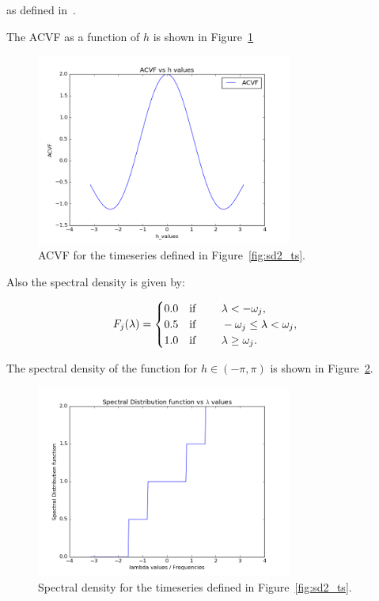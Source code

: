 \documentclass{article}
\begin{document}
as defined in~\cite{itsf}. 

The ACVF as a function of $h$ is shown in Figure~\ref{fig:sd2_acvf}

\begin{figure}[ht!]
  \centering
  \includegraphics[width=0.75\textwidth]{images/spectral_density_2/acvf}
  \caption{ACVF for the timeseries defined in Figure~\ref{fig:sd2_ts}.\label{fig:sd2_acvf}}
\end{figure}

Also the spectral density is given by:

\begin{align}
  F_{j}(\lambda) = \begin{cases}
    0.0 & \text{if \qquad } \lambda < -\omega_{j},\\
    0.5 & \text{if \qquad } -\omega_{j} \le \lambda < \omega_{j},\\
    1.0 & \text{if \qquad } \lambda \ge \omega_{j}.
  \end{cases}
\end{align}

The spectral density of the function for $h \in (-\pi, \pi)$ is shown in Figure~\ref{fig:sd2_sd}.

\begin{figure}[ht!]
  \centering
  \includegraphics[width=0.75\textwidth]{images/spectral_density_2/sd}
  \caption{Spectral density for the timeseries defined in Figure~\ref{fig:sd2_ts}.\label{fig:sd2_sd}}
\end{figure}
\end{document}
